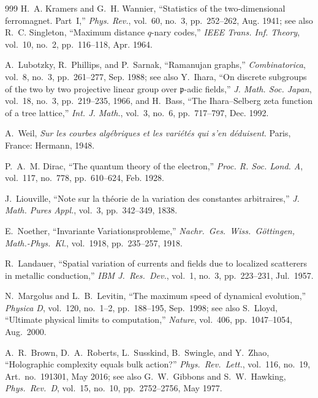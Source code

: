 \documentclass[11pt,letterpaper]{article}
\theoremstyle{spectralthm}
\begin{document}
\begin{thebibliography}{999}
H.~A. Kramers and G.~H. Wannier, ``Statistics of the two-dimensional ferromagnet. Part~I,'' \emph{Phys. Rev.}, vol.~60, no.~3, pp.~252--262, Aug. 1941; see also R.~C. Singleton, ``Maximum distance $q$-nary codes,'' \emph{IEEE Trans. Inf. Theory}, vol.~10, no.~2, pp.~116--118, Apr. 1964.

A.~Lubotzky, R.~Phillips, and P.~Sarnak, ``Ramanujan graphs,'' \emph{Combinatorica}, vol.~8, no.~3, pp.~261--277, Sep. 1988; see also Y.~Ihara, ``On discrete subgroups of the two by two projective linear group over $\mathfrak{p}$-adic fields,'' \emph{J. Math. Soc. Japan}, vol.~18, no.~3, pp.~219--235, 1966, and H.~Bass, ``The Ihara--Selberg zeta function of a tree lattice,'' \emph{Int. J. Math.}, vol.~3, no.~6, pp.~717--797, Dec. 1992.

A.~Weil, \emph{Sur les courbes alg\'{e}briques et les vari\'{e}t\'{e}s qui s'en d\'{e}duisent}. Paris, France: Hermann, 1948.

P.~A.~M. Dirac, ``The quantum theory of the electron,'' \emph{Proc. R. Soc. Lond. A}, vol.~117, no.~778, pp.~610--624, Feb. 1928.

J.~Liouville, ``Note sur la th\'{e}orie de la variation des constantes arbitraires,'' \emph{J. Math. Pures Appl.}, vol.~3, pp.~342--349, 1838.

E.~Noether, ``Invariante Variationsprobleme,'' \emph{Nachr.\ Ges.\ Wiss.\ G\"{o}ttingen, Math.-Phys.\ Kl.}, vol.~1918, pp.~235--257, 1918.

R.~Landauer, ``Spatial variation of currents and fields due to localized scatterers in metallic conduction,'' \emph{IBM J.\ Res.\ Dev.}, vol.~1, no.~3, pp.~223--231, Jul.\ 1957.

N.~Margolus and L.~B.~Levitin, ``The maximum speed of dynamical evolution,'' \emph{Physica D}, vol.~120, no.~1--2, pp.~188--195, Sep.\ 1998; see also S.~Lloyd, ``Ultimate physical limits to computation,'' \emph{Nature}, vol.~406, pp.~1047--1054, Aug.\ 2000.

A.~R.~Brown, D.~A.~Roberts, L.~Susskind, B.~Swingle, and Y.~Zhao, ``Holographic complexity equals bulk action?'' \emph{Phys.\ Rev.\ Lett.}, vol.~116, no.~19, Art.\ no.~191301, May 2016; see also G.~W.~Gibbons and S.~W.~Hawking, \emph{Phys.\ Rev.\ D}, vol.~15, no.~10, pp.~2752--2756, May 1977.


\end{thebibliography}
\end{document}
